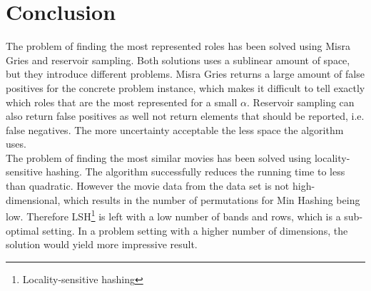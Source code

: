 
\section{Conclusion}
The problem of finding the most represented roles has been solved using Misra Gries and reservoir sampling. Both solutions uses a sublinear amount of space, but they introduce different problems. Misra Gries returns a large amount of false positives for the concrete problem instance, which makes it difficult to tell exactly which roles that are the most represented for a small \(\alpha\). Reservoir sampling can also return false positives as well not return elements that should be reported, i.e. false negatives. The more uncertainty acceptable the less space the algorithm uses.\\

The problem of finding the most similar movies has been solved using locality-sensitive hashing. The algorithm successfully reduces the running time to less than quadratic. However the movie data from the data set is not high-dimensional, which results in the number of permutations for Min Hashing being low. Therefore LSH\footnote{Locality-sensitive hashing} is left with a low number of bands and rows, which is a sub-optimal setting. In a problem setting with a higher number of dimensions, the solution would yield more impressive result.
